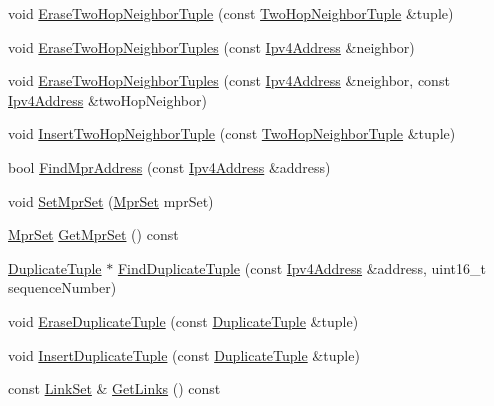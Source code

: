 \begin{DoxyCompactItemize}
\item 
void \hyperlink{classns3_1_1olsr_1_1OlsrState_adcf079d794ae8637cd1245c4705efc2c}{Erase\+Two\+Hop\+Neighbor\+Tuple} (const \hyperlink{structns3_1_1olsr_1_1TwoHopNeighborTuple}{Two\+Hop\+Neighbor\+Tuple} \&tuple)
\item 
void \hyperlink{classns3_1_1olsr_1_1OlsrState_a42bb2907567fb9ab9b17d28476c9859b}{Erase\+Two\+Hop\+Neighbor\+Tuples} (const \hyperlink{classns3_1_1Ipv4Address}{Ipv4\+Address} \&neighbor)
\item 
void \hyperlink{classns3_1_1olsr_1_1OlsrState_a160c5294a8e474cb043eb2a82e41e4a8}{Erase\+Two\+Hop\+Neighbor\+Tuples} (const \hyperlink{classns3_1_1Ipv4Address}{Ipv4\+Address} \&neighbor, const \hyperlink{classns3_1_1Ipv4Address}{Ipv4\+Address} \&two\+Hop\+Neighbor)
\item 
void \hyperlink{classns3_1_1olsr_1_1OlsrState_ab1fcedee8cd07d9067b1e5db4a84c80e}{Insert\+Two\+Hop\+Neighbor\+Tuple} (const \hyperlink{structns3_1_1olsr_1_1TwoHopNeighborTuple}{Two\+Hop\+Neighbor\+Tuple} \&tuple)
\item 
bool \hyperlink{classns3_1_1olsr_1_1OlsrState_aa73e8ae0cc7d2d68b148cc5937259d03}{Find\+Mpr\+Address} (const \hyperlink{classns3_1_1Ipv4Address}{Ipv4\+Address} \&address)
\item 
void \hyperlink{classns3_1_1olsr_1_1OlsrState_a8c59c2a9b6932ad26772f7041bd4d4e3}{Set\+Mpr\+Set} (\hyperlink{namespacens3_1_1olsr_aa7c4ede0ba85f0ea9da6e6699525bd4a}{Mpr\+Set} mpr\+Set)
\item 
\hyperlink{namespacens3_1_1olsr_aa7c4ede0ba85f0ea9da6e6699525bd4a}{Mpr\+Set} \hyperlink{classns3_1_1olsr_1_1OlsrState_ab4a6c1375ec139188c7894202ace1bfb}{Get\+Mpr\+Set} () const 
\item 
\hyperlink{structns3_1_1olsr_1_1DuplicateTuple}{Duplicate\+Tuple} $\ast$ \hyperlink{classns3_1_1olsr_1_1OlsrState_ab00d5bb24a075329d19cf44af31524d1}{Find\+Duplicate\+Tuple} (const \hyperlink{classns3_1_1Ipv4Address}{Ipv4\+Address} \&address, uint16\+\_\+t sequence\+Number)
\item 
void \hyperlink{classns3_1_1olsr_1_1OlsrState_ae5c6cc7ca8d102f3ac28026dd84149c4}{Erase\+Duplicate\+Tuple} (const \hyperlink{structns3_1_1olsr_1_1DuplicateTuple}{Duplicate\+Tuple} \&tuple)
\item 
void \hyperlink{classns3_1_1olsr_1_1OlsrState_a70d7c134bee69a2f22ad6daeaba8f0f8}{Insert\+Duplicate\+Tuple} (const \hyperlink{structns3_1_1olsr_1_1DuplicateTuple}{Duplicate\+Tuple} \&tuple)
\item 
const \hyperlink{namespacens3_1_1olsr_a60381cc41d65a2e0daabd286077a378a}{Link\+Set} \& \hyperlink{classns3_1_1olsr_1_1OlsrState_a1d8f1a95165973f05e3fd1ff0d76fbda}{Get\+Links} () const 

\end{DoxyCompactItemize}
